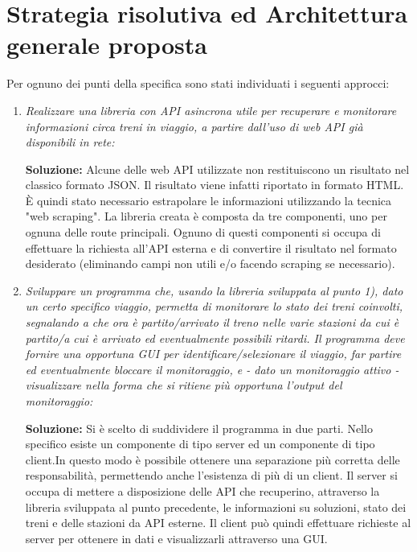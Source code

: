 \section{Strategia risolutiva ed Architettura generale proposta}
Per ognuno dei punti della specifica sono stati individuati i seguenti approcci:
\begin{enumerate}
    \item \textit{Realizzare una libreria con API asincrona utile per recuperare e monitorare informazioni circa treni in viaggio, a partire dall'uso di web API già disponibili in rete:}

    \noindent \textbf{Soluzione:} Alcune delle web API utilizzate non restituiscono un risultato nel classico formato JSON. Il risultato viene infatti riportato in formato HTML. È quindi stato necessario estrapolare le informazioni utilizzando la tecnica "web scraping". La libreria creata è composta da tre componenti, uno per ognuna delle route principali. Ognuno di questi componenti si occupa di effettuare la richiesta all'API esterna e di convertire il risultato nel formato desiderato (eliminando campi non utili e/o facendo scraping se necessario).
    \item \textit{Sviluppare un programma che, usando la libreria sviluppata al punto 1), dato un certo specifico viaggio, permetta di monitorare lo stato dei treni coinvolti, segnalando a che ora è partito/arrivato il treno nelle varie stazioni da cui è partito/a cui è arrivato ed eventualmente possibili ritardi. Il programma deve fornire una opportuna GUI per identificare/selezionare il viaggio, far partire ed eventualmente bloccare il monitoraggio, e - dato un monitoraggio attivo - visualizzare nella forma che si ritiene più opportuna l’output del monitoraggio:}

   \noindent \textbf{Soluzione:} Si è scelto di suddividere il programma in due parti. Nello specifico esiste un componente di tipo server ed un componente di tipo client.\newline In questo modo è possibile ottenere una separazione più corretta delle responsabilità, permettendo anche l'esistenza di più di un client.\newline
   Il server si occupa di mettere a disposizione delle API che recuperino, attraverso la libreria sviluppata al punto precedente, le informazioni su soluzioni, stato dei treni e delle stazioni da API esterne.\newline
   Il client può quindi effettuare richieste al server per ottenere in dati e visualizzarli attraverso una GUI.
\end{enumerate}
